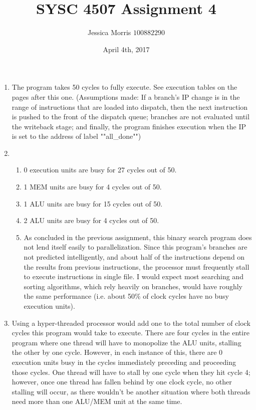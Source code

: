 \documentclass{article}
\title{SYSC 4507 Assignment 4}
\date{April 4th, 2017}
\author{Jessica Morris \(100882290\)}
\begin{document}
\maketitle

\begin{enumerate}

\item The program takes 50 cycles to fully execute. See execution tables on the pages after this one. (Assumptions made: If a branch's IP change is in the range of instructions that are loaded into dispatch, then the next instruction is pushed to the front of the dispatch queue; branches are not evaluated until the writeback stage; and finally, the program finishes execution when the IP is set to the address of label ""all\_done"")

\item
\begin{enumerate}
\item 0 execution units are busy for 27 cycles out of 50.
\item 1 MEM units are busy for 4 cycles out of 50.
\item 1 ALU units are busy for 15 cycles out of 50.
\item 2 ALU units are busy for 4 cycles out of 50.
\item As concluded in the previous assignment, this binary search program does not lend itself easily to parallelization. Since this program's branches are not predicted intelligently, and about half of the instructions depend on the results from previous instructions, the processor must frequently stall to execute instructions in single file. I would expect most searching and sorting algorithms, which rely heavily on branches, would have roughly the same performance (i.e. about 50\% of clock cycles have no busy execution units).
\end{enumerate}

\item Using a hyper-threaded processor would add one to the total number of clock cycles this program would take to execute. There are four cycles in the entire program where one thread will have to monopolize the ALU units, stalling the other by one cycle. However, in each instance of this, there are 0 execution units busy in the cycles immediately preceding and proceeding those cycles. One thread will have to stall by one cycle when they hit cycle 4; however, once one thread has fallen behind by one clock cycle, no other stalling will occur, as there wouldn't be another situation where both threads need more than one ALU/MEM unit at the same time.

\end{enumerate}
\end{document}
